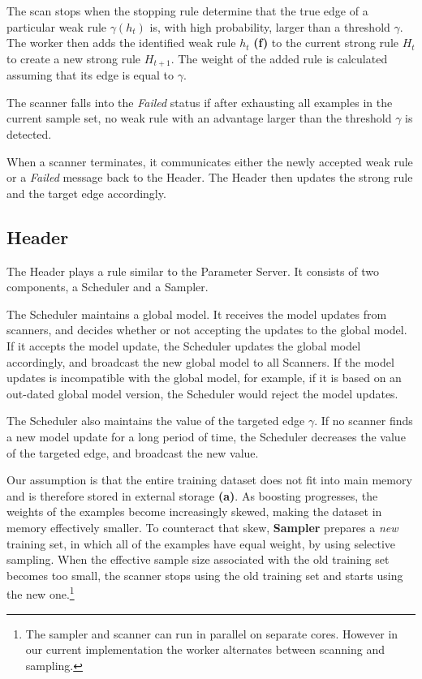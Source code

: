 The scan stops when the stopping rule determine that
the true edge of a particular weak rule
$\gamma(h_t)$ is, with high probability,
larger than a threshold $\gamma$. The
worker then adds the identified weak rule $h_t$ {\bf (f)} to the current
strong rule $H_t$ to create a new strong rule $H_{t+1}$.
The weight of the added rule is calculated assuming that its edge is
equal to $\gamma$.

The scanner falls into the \textit{Failed} status if after exhausting
all examples in the current sample set, no weak rule with an advantage
larger than the threshold $\gamma$ is detected.

When a scanner terminates, it communicates either the newly accepted
weak rule or a \textit{Failed} message back to the Header.
The Header then updates the strong rule and the target edge accordingly.


\subsection*{Header}

The Header plays a rule similar to the Parameter Server. It consists
of two components, a Scheduler and a Sampler.


The Scheduler maintains a global model. It receives the model updates from scanners, and decides whether or not accepting the updates to the global model. If it accepts the model update, the Scheduler updates the global model accordingly, and broadcast the new global model to all Scanners. If the model updates is incompatible with the global model, for example, if it is based on an out-dated global model version, the Scheduler would reject the model updates.

The Scheduler also maintains the value of
the targeted edge $\gamma$. If no scanner finds a new model update for a long period of time, the Scheduler decreases the value of the targeted edge, and broadcast the new value.

Our assumption is that the entire training dataset does
not fit into main memory and is therefore stored in external storage
{\bf (a)}. As boosting progresses, the weights of the examples become
increasingly skewed, making the dataset in memory effectively smaller.
To counteract that skew, {\bf Sampler} prepares a {\em new}
training set, in which all of the examples have equal weight, by using
selective sampling. When the effective sample size associated
with the old training set becomes too small, the scanner stops using
the old training set and starts using the new one.\footnote{The
  sampler and scanner can run in parallel on separate cores. However in
  our current implementation the worker alternates between scanning and
  sampling.}


